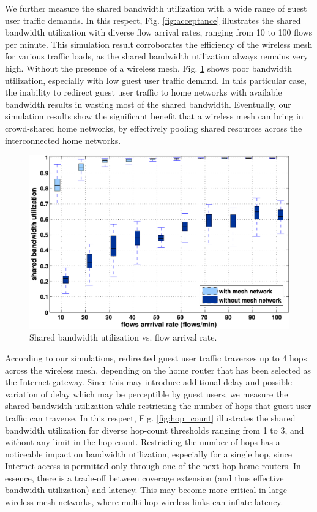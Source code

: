 We further measure the shared bandwidth utilization with a wide range of guest user traffic demands. In this respect, Fig. \ref{fig:acceptance} illustrates the shared bandwidth utilization with diverse flow arrival rates, ranging from 10 to 100 flows per minute. This simulation result corroborates the efficiency of the wireless mesh for various traffic loads, as the shared bandwidth utilization always remains very high. Without the presence of a wireless mesh, Fig. \ref{fig:utilization_arrival} shows poor bandwidth utilization, especially with low guest user traffic demand. In this particular case, the inability to redirect guest user traffic to home networks with available bandwidth results in wasting most of the shared bandwidth. Eventually, our simulation results show the significant benefit that a wireless mesh can bring in crowd-shared home networks, by effectively pooling shared resources across the interconnected home networks.

\begin{figure}[t]
\begin{center}
\includegraphics[width=1\linewidth]{results/boxplot2.pdf}
\caption{Shared bandwidth utilization vs. flow arrival rate.}
\label{fig:utilization_arrival}
\end{center}
\end{figure}

According to our simulations, redirected guest user traffic traverses up to 4 hops across the wireless mesh, depending on the home router that has been selected as the Internet gateway. Since this may introduce additional delay and possible variation of delay which may be perceptible by guest users, we measure the shared bandwidth utilization while restricting the number of hops that guest user traffic can traverse. In this respect, Fig. \ref{fig:hop_count} illustrates the shared bandwidth utilization for diverse hop-count thresholds ranging from 1 to 3, and without any limit in the hop count. Restricting the number of hops has a noticeable impact on bandwidth utilization, especially for a single hop, since Internet access is permitted only through one of the next-hop home routers. In essence, there is a trade-off between coverage extension (and thus effective bandwidth utilization) and latency. This may become more critical in large wireless mesh networks, where multi-hop wireless links can inflate latency.


